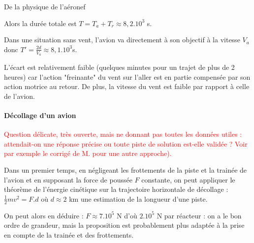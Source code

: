 \begin{exo}[PC][1][devoir]{De la physique de l'aéronef}
\begin{quest}
{      
      
      Alors la durée totale est $T=T_a+T_r\approx 8,2.10^3$ s.
      
      Dans une situation sans vent, l'avion va directement à son objectif à la vitesse $V_a$ donc $T'=\frac{2d}{V_a}\approx 8,1.10^3$s.
      
      L'écart est relativement faible (quelques minutes pour un trajet de plus de 2 heures) car l'action "freinante"  du vent sur l'aller est en partie compensée par son action motrice au retour. De plus, la vitesse du vent est faible par rapport à celle de l'avion.
      
  }

\end{quest}
  
  \paragraph{Décollage d'un avion}
  \begin{quest}
    { 
      \textcolor{red}{Question délicate, très ouverte, mais ne donnant pas toutes les données utiles : attendait-on une réponse précise ou toute piste de solution est-elle validée ? Voir par exemple le corrigé de M.  pour une autre approche).}

      Dans un premier temps, en négligeant les frottements de la piste et la trainée de l'avion et en supposant la force de poussée $F$ constante, on peut appliquer le théorème de l'énergie cinétique sur la trajectoire horizontale de décollage : $\frac 1 2 m v^2=F.d$ où $d\approx 2$ km une estimation de la longueur d'une piste.
      
      On peut alors en déduire : $F\approx 7.10^5$ N d'où $2.10^5$ N par réacteur : on a le bon ordre de grandeur, mais la proposition est probablement plus adaptée à la prise en compte de la trainée et des frottements.
      
}
\end{quest}
\end{exo}
